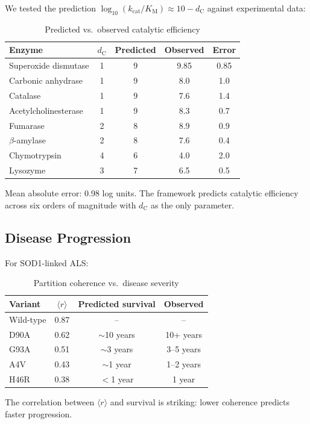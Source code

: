 ﻿\documentclass[twocolumn,10pt,a4paper]{article}
\theoremstyle{definition}
\theoremstyle{remark}
\newcommand{\Order}{\langle r \rangle}
\newcommand{\kcat}{k_{\mathrm{cat}}}
\newcommand{\Km}{K_{\mathrm{M}}}
\newcommand{\dC}{d_{\mathrm{C}}}
\begin{document}
We tested the prediction $\log_{10}(\kcat/\Km) \approx 10 - \dC$ against experimental data:

\begin{table}[h]
\centering
\caption{Predicted vs.\ observed catalytic efficiency}
\label{tab:validation_enzyme}
\begin{tabular}{lcccc}
\toprule
Enzyme & $\dC$ & Predicted & Observed & Error \\
\midrule
Superoxide dismutase & 1 & 9 & 9.85 & 0.85 \\
Carbonic anhydrase & 1 & 9 & 8.0 & 1.0 \\
Catalase & 1 & 9 & 7.6 & 1.4 \\
Acetylcholinesterase & 1 & 9 & 8.3 & 0.7 \\
Fumarase & 2 & 8 & 8.9 & 0.9 \\
$\beta$-amylase & 2 & 8 & 7.6 & 0.4 \\
Chymotrypsin & 4 & 6 & 4.0 & 2.0 \\
Lysozyme & 3 & 7 & 6.5 & 0.5 \\
\bottomrule
\end{tabular}
\end{table}

Mean absolute error: 0.98 log units. The framework predicts catalytic efficiency across six orders of magnitude with $\dC$ as the only parameter.

\subsection{Disease Progression}

For SOD1-linked ALS:

\begin{table}[h]
\centering
\caption{Partition coherence vs.\ disease severity}
\label{tab:validation_als}
\begin{tabular}{lccc}
\toprule
Variant & $\Order$ & Predicted survival & Observed \\
\midrule
Wild-type & 0.87 & -- & -- \\
D90A & 0.62 & $\sim$10 years & 10+ years \\
G93A & 0.51 & $\sim$3 years & 3--5 years \\
A4V & 0.43 & $\sim$1 year & 1--2 years \\
H46R & 0.38 & $<$1 year & 1 year \\
\bottomrule
\end{tabular}
\end{table}

The correlation between $\Order$ and survival is striking: lower coherence predicts faster progression.
\end{document}
